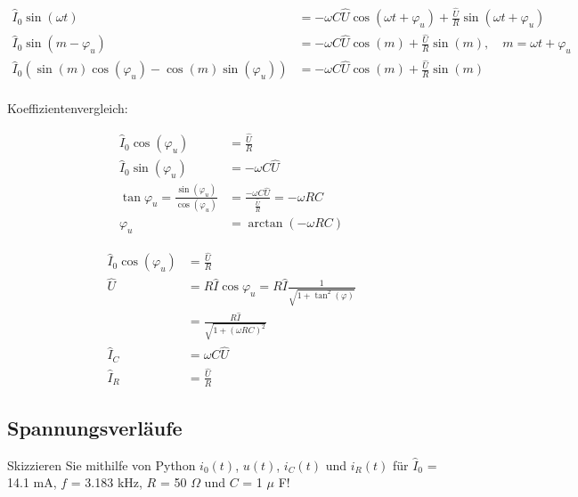 \documentclass[
  ngerman,
  letterpaper,
]{scrbook}
\begin{document}
\begin{align}
\hat{I}_0 \sin(\omega t) &= -\omega C \hat{U} \cos(\omega t + \varphi_u) + \frac{\hat{U}}{R} \sin(\omega t + \varphi_u) \\
\hat{I}_0 \sin(m - \varphi_u) &= -\omega C \hat{U} \cos(m) + \frac{\hat{U}}{R} \sin(m), \quad m=\omega t + \varphi_u \\
\hat{I}_0 \left( \sin(m) \cos(\varphi_u) - \cos(m) \sin(\varphi_u) \right) &= -\omega C \hat{U} \cos(m) + \frac{\hat{U}}{R} \sin(m) \\
\end{align}

Koeffizientenvergleich:

\begin{align}
\hat{I}_0 \cos(\varphi_u) &= \frac{\hat{U}}{R} \\
\hat{I}_0 \sin(\varphi_u) &= -\omega C \hat{U} \\
\tan{\varphi_u} = \frac{\sin(\varphi_u)}{\cos(\varphi_u)} &= \frac{-\omega C \hat{U}}{\frac{\hat{U}}{R}} = -\omega R C \\
\varphi_u &= \arctan(-\omega R C)
\end{align}

\begin{align}
\hat{I}_0 \cos(\varphi_u) &= \frac{\hat{U}}{R} \\
\hat{U} &= R \hat{I} \cos{\varphi_u} = R \hat{I} \frac{1}{\sqrt{1+\tan^2(\varphi)}} \\
&= \frac{R \hat{I}}{\sqrt{1+(\omega R C)^2}} \\
\hat{I}_C &= \omega C \hat{U} \\
\hat{I}_R &= \frac{\hat{U}}{R}
\end{align}

\subsection{Spannungsverläufe}\label{spannungsverluxe4ufe}

Skizzieren Sie mithilfe von Python \(i_0(t)\), \(u(t)\), \(i_C(t)\) und
\(i_R(t)\) für \(\hat{I}_0\) = 14.1 mA, \(f\) = 3.183 kHz, \(R\) = 50
\(\Omega\) und \(C\) = 1 \(\mu\) F!
\end{document}
